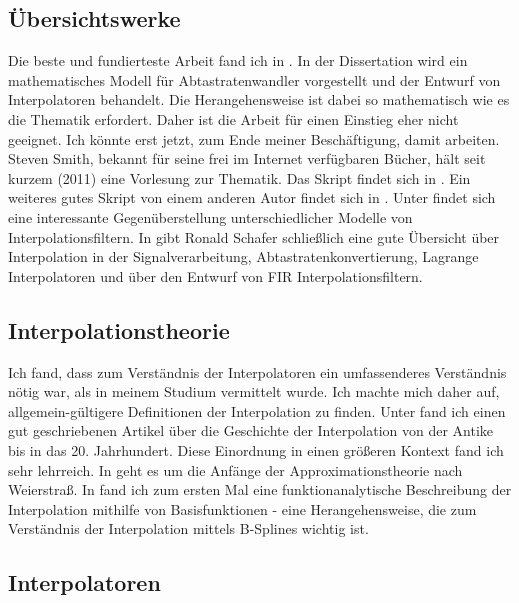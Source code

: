 \documentclass[11pt]{article}
\begin{document}
\vspace{1mm}

\subsection*{Übersichtswerke}

Die beste und fundierteste Arbeit fand ich in \cite{Evangelista2001}.  In der Dissertation wird ein mathematisches Modell für Abtastratenwandler vorgestellt
und der Entwurf von Interpolatoren behandelt. Die Herangehensweise ist dabei so mathematisch wie es die Thematik erfordert.
Daher ist die Arbeit für einen Einstieg eher nicht geeignet. Ich könnte erst jetzt, zum Ende meiner Beschäftigung, damit arbeiten.\\ Steven Smith, bekannt für seine frei im Internet verfügbaren Bücher, hält seit 
kurzem (2011) eine Vorlesung zur Thematik. Das Skript findet sich in \cite{Smith2011}. Ein weiteres gutes Skript von einem anderen Autor findet sich in \cite{Babic}. Unter \cite{Lehtinen2004} findet sich eine
interessante Gegenüberstellung unterschiedlicher Modelle von Interpolationsfiltern. In \cite{Schafer1973} gibt Ronald Schafer schließlich eine
gute Übersicht über Interpolation in der Signalverarbeitung, Abtastratenkonvertierung, Lagrange Interpolatoren und über den Entwurf von FIR Interpolationsfiltern.

\subsection*{Interpolationstheorie}

Ich fand, dass zum Verständnis der Interpolatoren ein umfassenderes Verständnis nötig war, als in meinem Studium vermittelt 
wurde. Ich machte mich daher auf, allgemein-gültigere Definitionen der Interpolation zu finden. Unter \cite{Meijering2002} fand ich einen
gut geschriebenen Artikel über die Geschichte der Interpolation von der Antike bis in das 20. Jahrhundert. Diese Einordnung in einen größeren Kontext fand ich sehr 
lehrreich. In \cite{Pinkus} geht es um die  Anfänge der Approximationstheorie nach Weierstraß. In \cite{Fomel2000} fand ich zum ersten Mal
eine funktionanalytische Beschreibung der Interpolation mithilfe von Basisfunktionen - eine Herangehensweise, die zum Verständnis der Interpolation
mittels B-Splines wichtig ist.

\subsection*{Interpolatoren}
\end{document}
